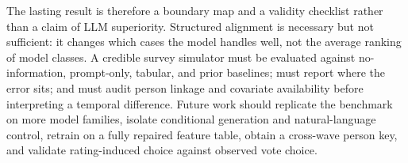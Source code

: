 The lasting result is therefore a boundary map and a validity checklist rather
than a claim of LLM superiority. Structured alignment is necessary but not
sufficient: it changes which cases the model handles well, not the average
ranking of model classes. A credible survey simulator must be evaluated against
no-information, prompt-only, tabular, and prior baselines; must report where the
error sits; and must audit person linkage and covariate availability before
interpreting a temporal difference. Future work should replicate the benchmark
on more model families, isolate conditional generation and natural-language
control, retrain on a fully repaired feature table, obtain a cross-wave person
key, and validate rating-induced choice against observed vote choice.
